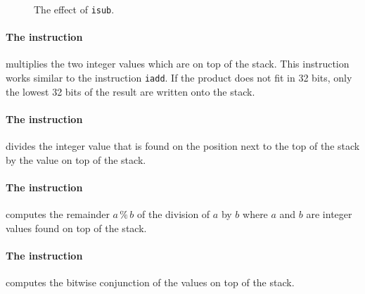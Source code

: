 \setlength{\unitlength}{0.5cm}
\begin{figure}[!ht]
  \centering
{}
  \caption{The effect of \texttt{isub}.}
  \label{fig:ijvm-sub}
\end{figure}


\paragraph{The instruction }
multiplies the two integer values which are on top of the stack.  This instruction works similar to
the instruction \texttt{iadd}.  If the product does not fit in 32 bits, only the lowest 32 bits of
the result are written onto the stack. 




\paragraph{The instruction }
divides the integer value that is found on the position next to the  top of the stack by the value
on top of the stack. 


\paragraph{The instruction }
computes the remainder $a \,\texttt{\%}\, b$ of the division of $a$ by $b$ where $a$ and $b$ are
integer values found on top of the stack.


\paragraph{The instruction }
computes the bitwise conjunction of the values on top of the stack.



